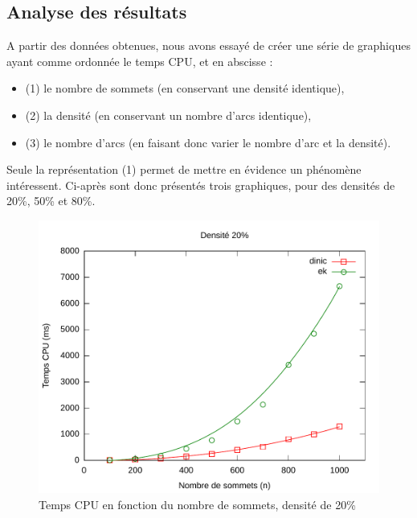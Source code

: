 \subsection{Analyse des résultats}

A partir des données obtenues, nous avons essayé de créer une série de graphiques ayant comme ordonnée le temps CPU, et en abscisse :
\begin{itemize}
  \item (1) le nombre de sommets (en conservant une densité identique),
  \item (2) la densité (en conservant un nombre d'arcs identique),
  \item (3) le nombre d'arcs (en faisant donc varier le nombre d'arc et la densité).
\end{itemize}

Seule la représentation (1) permet de mettre en évidence un phénomène intéressent. Ci-après sont donc présentés trois graphiques, pour des densités de 20\%, 50\% et 80\%.

\begin{figure}[h!]
\begin{center}
\includegraphics[width=\textwidth]{files/c20}
\end{center}
\caption{Temps CPU en fonction du nombre de sommets, densité de 20\%}
\end{figure}

